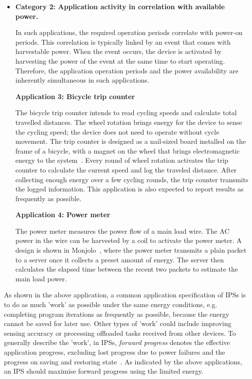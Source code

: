 \begin{itemize}
  \item \textbf{Category 2: Application activity in correlation with available power.}
  
  In such applications, the required operation periods correlate with power-on periods. 
  This correlation is typically linked by an event that comes with harvestable power. 
  When the event occurs, the device is activated by harvesting the power of the event at the same time to start operating. 
  Therefore, the application operation periods and the power availability are inherently simultaneous in such applications. 

  \textbf{Application 3: Bicycle trip counter}

  The bicycle trip counter intends to read cycling speeds and calculate total travelled distances. 
  The wheel rotation brings energy for the device to sense the cycling speed; the device does not need to operate without cycle movement. 
  The trip counter is designed as a nail-sized board installed on the frame of a bicycle, with a magnet on the wheel that brings electromagnetic energy to the system~\cite{bing2018energy}. 
  Every round of wheel rotation activates the trip counter to calculate the current speed and log the traveled distance. 
  After collecting enough energy over a few cycling rounds, the trip counter transmits the logged information. 
  This application is also expected to report results as frequently as possible. 

  \textbf{Application 4: Power meter}

  The power meter measures the power flow of a main load wire. 
  The AC power in the wire can be harvested by a coil to activate the power meter. 
  A design is shown in Monjolo~\cite{debruin2013monjolo}, where the power meter transmits a plain packet to a server once it collects a preset amount of energy. 
  The server then calculates the elapsed time between the recent two packets to estimate the main load power. 

\end{itemize}
  
As shown in the above application, a common application specification of IPSs is to do as much 'work' as possible under the same energy conditions, e.g. completing program iterations as frequently as possible, because the energy cannot be saved for later use. 
Other types of 'work' could include improving sensing accuracy or processing offloaded tasks received from other devices. 
To generally describe the 'work', in IPSs, \textit{forward progress} denotes the effective application progress, excluding lost progress due to power failures and the progress on saving and restoring state~\cite{7478428}.
As indicated by the above applications, an IPS should maximise forward progress using the limited energy. 

